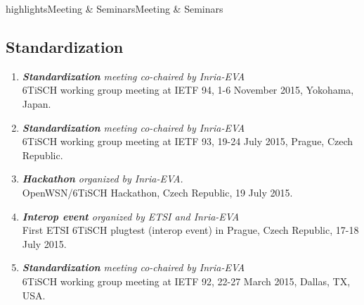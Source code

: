 \documentclass{ra2016}
\begin{document}
\begin{module}{highlights}{Meeting \& Seminars}{Meeting \& Seminars}
\subsection{Standardization}
\begin{enumerate}
    \item \textit{\textbf{Standardization} meeting co-chaired by Inria-EVA}\\
        6TiSCH working group meeting at IETF 94, 1-6 November 2015, Yokohama, Japan.
    \item \textit{\textbf{Standardization} meeting co-chaired by Inria-EVA}\\
        6TiSCH working group meeting at IETF 93, 19-24 July 2015, Prague, Czech Republic.
    \item \textit{\textbf{Hackathon} organized by Inria-EVA.}\\
        OpenWSN/6TiSCH Hackathon, Czech Republic, 19 July 2015.
    \item \textit{\textbf{Interop event} organized by ETSI and Inria-EVA}\\
        First ETSI 6TiSCH plugtest (interop event) in Prague, Czech Republic, 17-18 July 2015.
    \item \textit{\textbf{Standardization} meeting co-chaired by Inria-EVA}\\
        6TiSCH working group meeting at IETF 92, 22-27 March 2015, Dallas, TX, USA.        
\end{enumerate}


\end{module}
\end{document}
